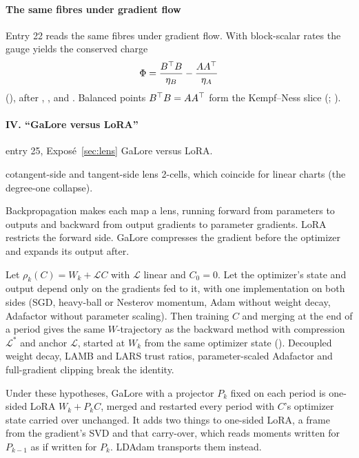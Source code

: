 \paragraph{The same fibres under gradient flow}
Entry 22 reads the same fibres under gradient flow. With block-scalar rates the gauge yields the conserved charge
\begin{equation}\label{eq:rosetta-charge}
  \Phi=\frac{B\T B}{\eta_B}-\frac{AA\T}{\eta_A}
\end{equation}
(), after \citet{du2018algorithmic}, \citet{arora2018optimization}, \citet{zhao2022symmetries}
and \citet{marcotte2023abide}. Balanced points $B\T B=AA\T$ form the Kempf--Ness slice (;
\citealp{xkempf1979length,xrichardson1990minimum}).

\paragraph{IV. ``GaLore versus LoRA''}

\begin{example*}{entry 25, Exposé~\ref{sec:lens}}
\enspace GaLore versus LoRA.\par
\noindent{}\enspace cotangent-side and tangent-side lens
2-cells, which coincide for linear charts (the degree-one collapse).
\end{example*}

Backpropagation makes each map a lens, running forward from parameters to outputs and backward from output gradients to
parameter gradients. LoRA restricts the forward side. GaLore compresses the gradient before the optimizer and expands
its output after.

Let $\rho_k(C)=W_k+\mathcal LC$ with $\mathcal L$ linear and $C_0=0$. Let the optimizer's state and output depend only
on the gradients fed to it, with one implementation on both sides (SGD, heavy-ball or Nesterov momentum, Adam without
weight decay, Adafactor without parameter scaling). Then training $C$ and merging at the end of a period gives the same
$W$-trajectory as the backward method with compression $\mathcal L^*$ and anchor $\mathcal L$, started at $W_k$ from the
same optimizer state (). Decoupled weight decay, LAMB and LARS trust ratios, parameter-scaled
Adafactor and full-gradient clipping break the identity.

\begin{explains}
Under these hypotheses, GaLore with a projector $P_k$ fixed on each period is one-sided LoRA $W_k+P_kC$, merged and
restarted every period with $C$'s optimizer state carried over unchanged. It adds two things to one-sided LoRA, a frame
from the gradient's SVD and that carry-over, which reads moments written for $P_{k-1}$ as if written for $P_k$. LDAdam
\citep{xrobert2025ldadam} transports them instead.
\end{explains}

